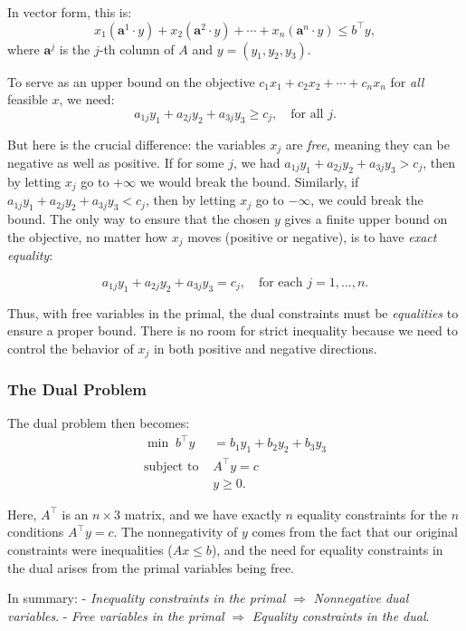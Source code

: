 In vector form, this is:
\[
x_1(\mathbf{a}^1 \cdot y) + x_2(\mathbf{a}^2 \cdot y) + \cdots + x_n(\mathbf{a}^n \cdot y) \leq b^\top y,
\]
where $\mathbf{a}^j$ is the $j$-th column of $A$ and $y = (y_1, y_2, y_3)$.

To serve as an upper bound on the objective $c_1x_1 + c_2x_2 + \cdots + c_n x_n$ for \emph{all} feasible $x$, we need:
\[
a_{1j}y_1 + a_{2j}y_2 + a_{3j}y_3 \geq c_j, \quad \text{for all } j.
\]

But here is the crucial difference: the variables $x_j$ are \emph{free}, meaning they can be negative as well as positive. If for some $j$, we had $a_{1j}y_1 + a_{2j}y_2 + a_{3j}y_3 > c_j$, then by letting $x_j$ go to $+\infty$ we would break the bound. Similarly, if $a_{1j}y_1 + a_{2j}y_2 + a_{3j}y_3 < c_j$, then by letting $x_j$ go to $-\infty$, we could break the bound. The only way to ensure that the chosen $y$ gives a finite upper bound on the objective, no matter how $x_j$ moves (positive or negative), is to have \emph{exact equality}:

\[
a_{1j}y_1 + a_{2j}y_2 + a_{3j}y_3 = c_j, \quad \text{for each } j=1,\ldots,n.
\]

Thus, with free variables in the primal, the dual constraints must be \emph{equalities} to ensure a proper bound. There is no room for strict inequality because we need to control the behavior of $x_j$ in both positive and negative directions.

\subsubsection*{The Dual Problem}

The dual problem then becomes:
\[
\begin{aligned}
\min \; b^\top y &= b_1y_1 + b_2y_2 + b_3y_3 \\
\text{subject to } & A^\top y = c \\
& y \geq 0.
\end{aligned}
\]

Here, $A^\top$ is an $n \times 3$ matrix, and we have exactly $n$ equality constraints for the $n$ conditions $A^\top y = c$. The nonnegativity of $y$ comes from the fact that our original constraints were inequalities ($A x \leq b$), and the need for equality constraints in the dual arises from the primal variables being free.

In summary:
- \emph{Inequality constraints in the primal} $\Rightarrow$ \emph{Nonnegative dual variables}.
- \emph{Free variables in the primal} $\Rightarrow$ \emph{Equality constraints in the dual}.

